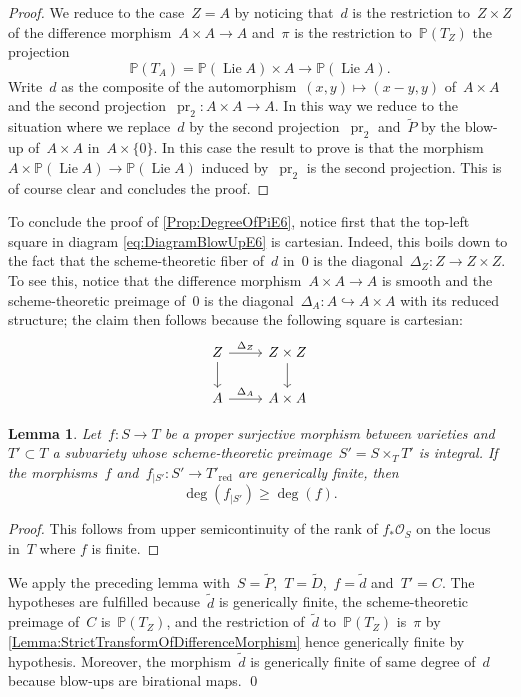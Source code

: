 \documentclass[a4paper]{amsart}
\newcommand{\bbP}{\mathbb{P}}
\newcommand{\cO}{\mathcal{O}}
\newcommand{\into}{\hookrightarrow}
\newcommand{\too}{\longrightarrow}
\DeclareMathOperator{\pr}{pr}
\newcommand{\red}{{\mathrm{red}}}
\DeclareMathOperator{\Lie}{Lie}
\renewcommand{\ge}{\geqslant}
\theoremstyle{plain}
\newtheorem{lemma}[theorem]{Lemma}
\theoremstyle{definition}
\numberwithin{equation}{section}
\begin{document}
\begin{proof} We reduce to the case~$Z = A$ by noticing that~$d$ is the restriction to~$Z \times Z$ of the difference morphism~$A \times A \to A$ and~$\pi$ is the restriction to~$\bbP(T_Z)$ the projection \[\bbP(T_A) = \bbP(\Lie A) \times A \too \bbP(\Lie A).\]
Write~$d$ as the composite of the automorphism~$(x, y) \mapsto (x-y, y)$ of~$A \times A$ and the second projection~$\pr_2 \colon A \times A \to A$. In this way we reduce to the situation where we replace~$d$ by the second projection~$\pr_2$ and~$\tilde{P}$ by the blow-up of~$A \times A$ in~$A \times \{ 0 \}$. In this case the result to prove is that the morphism
$A \times \bbP(\Lie A) \to \bbP(\Lie A)$ induced by~$\pr_2$ is the second projection. This is of course clear and concludes the proof.
\end{proof}

To conclude the proof of \cref{Prop:DegreeOfPiE6}, notice first that the top-left square in diagram \eqref{eq:DiagramBlowUpE6} is cartesian. Indeed, this boils down to the fact that the scheme-theoretic fiber of~$d$ in~$0$ is the diagonal~$\Delta_Z \colon Z \to Z \times Z$. To see this, notice that the difference morphism~$A \times A \to A$ is smooth and the scheme-theoretic preimage of~$0$ is the diagonal~$\Delta_A \colon A \into A \times A$ with its reduced structure; the claim then follows because the following square is cartesian:
\[
\begin{tikzcd}
Z \ar[r, "\Delta_Z"] \ar[d] & Z \times Z \ar[d] \\
A \ar[r, "\Delta_A"] & A \times A
\end{tikzcd}
\]

\begin{lemma} Let~$f \colon S \to T$ be a proper surjective morphism between varieties and~$T' \subset T$ a subvariety whose scheme-theoretic preimage~$S' = S \times_T T'$ is integral. If the morphisms~$f$ and~$f_{\rvert S'} \colon S' \to T'_{\red}$ are generically finite, then
\[ \deg (f_{\rvert S'}) \ge \deg (f). \]
\end{lemma}

\begin{proof} 
This follows from upper semicontinuity of the rank of $f_\ast \cO_S$ on the locus in~$T$ where $f$ is finite.
\end{proof}

We apply the preceding lemma with~$S = \tilde{P}$,~$T = \tilde{D}$,~$f = \tilde{d}$ and~$T' = C$. The hypotheses are fulfilled because~$\tilde{d}$ is generically finite, the scheme-theoretic preimage of~$C$ is~$\bbP(T_Z)$, and the restriction of~$\tilde{d}$ to~$\bbP(T_Z)$ is~$\pi$ by \cref{Lemma:StrictTransformOfDifferenceMorphism} hence generically finite by hypothesis. Moreover, the morphism~$\tilde{d}$ is generically finite of same degree of~$d$ because blow-ups are birational maps. 
\qed
\end{document}
